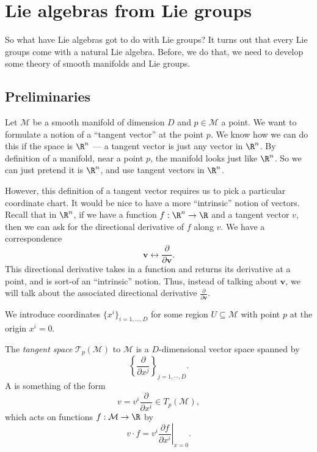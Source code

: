 \documentclass[a4paper]{article}
\begin{document}
\section{Lie algebras from Lie groups}
So what have Lie algebras got to do with Lie groups? It turns out that every Lie groups come with a natural Lie algebra. Before, we do that, we need to develop some theory of smooth manifolds and Lie groups.

\subsection{Preliminaries}
Let $\mathcal{M}$ be a smooth manifold of dimension $D$ and $p \in \mathcal{M}$ a point. We want to formulate a notion of a ``tangent vector'' at the point $p$. We know how we can do this if the space is $\R^n$ --- a tangent vector is just any vector in $\R^n$. By definition of a manifold, near a point $p$, the manifold looks just like $\R^n$. So we can just pretend it is $\R^n$, and use tangent vectors in $\R^n$.

However, this definition of a tangent vector requires us to pick a particular coordinate chart. It would be nice to have a more ``intrinsic'' notion of vectors. Recall that in $\R^n$, if we have a function $f: \R^n \to \R$ and a tangent vector $v$, then we can ask for the directional derivative of $f$ along $v$. We have a correspondence
\[
  \mathbf{v} \longleftrightarrow \frac{\partial}{\partial \mathbf{v}}.
\]
This directional derivative takes in a function and returns its derivative at a point, and is sort-of an ``intrinsic'' notion. Thus, instead of talking about $\mathbf{v}$, we will talk about the associated directional derivative $\frac{\partial}{\partial \mathbf{v}}$.

We introduce coordinates $\{x^i\}_{i = 1, \ldots, D}$ for some region $U \subseteq \mathcal{M}$ with point $p$ at the origin $x^i = 0$.

\begin{defi}
  The \emph{tangent space} $\mathcal{T}_p (\mathcal{M})$ to $\mathcal{M}$ is a $D$-dimensional vector space spanned by
  \[
    \left\{\frac{\partial}{\partial x^j}\right\}_{j = 1, \cdots, D}.
  \]
  A  is something of the form
  \[
    v = v^i \frac{\partial}{\partial x^i} \in T_p(\mathcal{M}),
  \]
  which acts on functions $f: \mathcal{M} \to \R$ by
  \[
    v \cdot f = v^i \left.\frac{\partial f}{\partial x^i} \right|_{x = 0}.
  \]
\end{defi}
\end{document}
